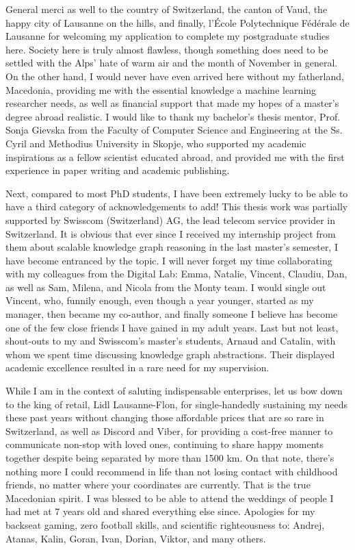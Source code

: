 General merci as well to the country of Switzerland, the canton of Vaud, the happy city of Lausanne on the hills, and finally, l'École Polytechnique Fédérale de Lausanne for welcoming my application to complete my postgraduate studies here. Society here is truly almost flawless, though something does need to be settled with the Alps' hate of warm air and the month of November in general. On the other hand, I would never have even arrived here without my fatherland, Macedonia, providing me with the essential knowledge a machine learning researcher needs, as well as financial support that made my hopes of a master's degree abroad realistic. I would like to thank my bachelor's thesis mentor, Prof. Sonja Gievska from the Faculty of Computer Science and Engineering at the Ss. Cyril and Methodius University in Skopje, who supported my academic inspirations as a fellow scientist educated abroad, and provided me with the first experience in paper writing and academic publishing.

Next, compared to most PhD students, I have been extremely lucky to be able to have a third category of acknowledgements to add! This thesis work was partially supported by Swisscom (Switzerland) AG, the lead telecom service provider in Switzerland. It is obvious that ever since I received my internship project from them about scalable knowledge graph reasoning in the last master's semester, I have become entranced by the topic. I will never forget my time collaborating with my colleagues from the Digital Lab: Emma, Natalie, Vincent, Claudiu, Dan, as well as Sam, Milena, and Nicola from the Monty team. I would single out Vincent, who, funnily enough, even though a year younger, started as my manager, then became my co-author, and finally someone I believe has become one of the few close friends I have gained in my adult years. Last but not least, shout-outs to my and Swisscom's master's students, Arnaud and Catalin, with whom we spent time discussing knowledge graph abstractions. Their displayed academic excellence resulted in a rare need for my supervision. 

While I am in the context of saluting indispensable enterprises, let us bow down to the king of retail, Lidl Lausanne-Flon, for single-handedly sustaining my needs these past years without changing those affordable prices that are so rare in Switzerland, as well as Discord and Viber, for providing a cost-free manner to communicate non-stop with loved ones, continuing to share happy moments together despite being separated by more than 1500 km. On that note, there's nothing more I could recommend in life than not losing contact with childhood friends, no matter where your coordinates are currently. That is the true Macedonian spirit. I was blessed to be able to attend the weddings of people I had met at 7 years old and shared everything else since. Apologies for my backseat gaming, zero football skills, and scientific righteousness to: Andrej, Atanas, Kalin, Goran, Ivan, Dorian, Viktor, and many others.

